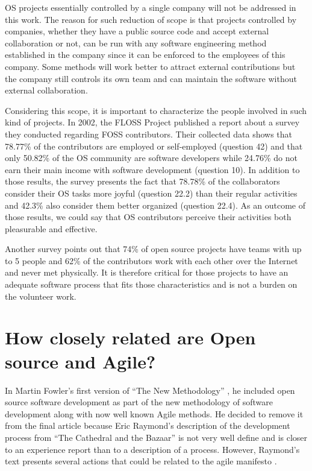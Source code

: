 \documentclass[lnbip]{svmultln}
\begin{document}
OS projects essentially controlled by a single company will not be
addressed in this work. The reason for such reduction of scope is that
projects controlled by companies, whether they have a public source
code and accept external collaboration or not, can be run with any
software engineering method established in the company since it can be
enforced to the employees of this company. Some methods will work
better to attract external contributions but the company still
controls its own team and can maintain the software without external
collaboration.

Considering this scope, it is important to characterize the people
involved in such kind of projects. In 2002, the FLOSS Project
\cite{url:flossproject} published a report about a survey they
conducted regarding FOSS contributors. Their collected data
\cite{url:flossdata} shows that 78.77\% of the contributors are
employed or self-employed (question 42) and that only 50.82\% of the
OS community are software developers while 24.76\% do not earn their
main income with software development (question 10).  In addition to
those results, the survey presents the fact that 78.78\% of the
collaborators consider their OS tasks more joyful (question 22.2) than
their regular activities and 42.3\% also consider them better
organized (question 22.4). As an outcome of those results, we could
say that OS contributors perceive their activities both pleasurable
and effective.


Another survey \cite{reis2003} points out that 74\% of open source
projects have teams with up to 5 people and 62\% of the contributors
work with each other over the Internet and never met physically.  It
is therefore critical for those projects to have an adequate software
process that fits those characteristics and is not a burden on the
volunteer work.


\section{How closely related are Open source and Agile?}
\label{sec:relation}

In Martin Fowler's first version of ``The New Methodology''
\cite{url:fowler2000orig}, he included open source software
development as part of the new methodology of software development
along with now well known Agile methods. He decided to remove it from
the final article because Eric Raymond's description of the
development process from ``The Cathedral and the Bazaar''
\cite{raymond1999} is not very well define and is closer to an
experience report than to a description of a process. However,
Raymond's text presents several actions that could be related to the
agile manifesto \cite{url:agilemanifesto}. 
\end{document}

